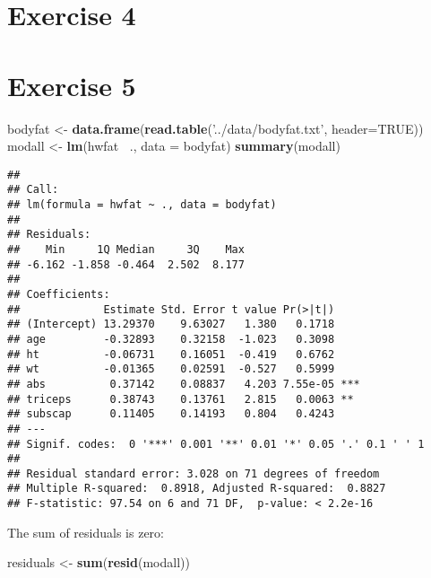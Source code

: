 \documentclass[]{article}
\newenvironment{Shaded}{\begin{snugshade}}{\end{snugshade}}
\newcommand{\DataTypeTok}[1]{\textcolor[rgb]{0.13,0.29,0.53}{#1}}
\newcommand{\KeywordTok}[1]{\textcolor[rgb]{0.13,0.29,0.53}{\textbf{#1}}}
\newcommand{\NormalTok}[1]{#1}
\newcommand{\OperatorTok}[1]{\textcolor[rgb]{0.81,0.36,0.00}{\textbf{#1}}}
\newcommand{\OtherTok}[1]{\textcolor[rgb]{0.56,0.35,0.01}{#1}}
\newcommand{\StringTok}[1]{\textcolor[rgb]{0.31,0.60,0.02}{#1}}
\begin{document}
\hypertarget{exercise-4}{%
\section{Exercise 4}\label{exercise-4}}

\hypertarget{exercise-5}{%
\section{Exercise 5}\label{exercise-5}}

\begin{Shaded}
\begin{Highlighting}[]
\NormalTok{bodyfat <-}\StringTok{ }\KeywordTok{data.frame}\NormalTok{(}\KeywordTok{read.table}\NormalTok{(}\StringTok{'../data/bodyfat.txt'}\NormalTok{, }\DataTypeTok{header=}\OtherTok{TRUE}\NormalTok{))}
\NormalTok{modall <-}\StringTok{ }\KeywordTok{lm}\NormalTok{(hwfat }\OperatorTok{~}\NormalTok{., }\DataTypeTok{data =}\NormalTok{ bodyfat)}
\KeywordTok{summary}\NormalTok{(modall)}
\end{Highlighting}
\end{Shaded}

\begin{verbatim}
## 
## Call:
## lm(formula = hwfat ~ ., data = bodyfat)
## 
## Residuals:
##    Min     1Q Median     3Q    Max 
## -6.162 -1.858 -0.464  2.502  8.177 
## 
## Coefficients:
##             Estimate Std. Error t value Pr(>|t|)    
## (Intercept) 13.29370    9.63027   1.380   0.1718    
## age         -0.32893    0.32158  -1.023   0.3098    
## ht          -0.06731    0.16051  -0.419   0.6762    
## wt          -0.01365    0.02591  -0.527   0.5999    
## abs          0.37142    0.08837   4.203 7.55e-05 ***
## triceps      0.38743    0.13761   2.815   0.0063 ** 
## subscap      0.11405    0.14193   0.804   0.4243    
## ---
## Signif. codes:  0 '***' 0.001 '**' 0.01 '*' 0.05 '.' 0.1 ' ' 1
## 
## Residual standard error: 3.028 on 71 degrees of freedom
## Multiple R-squared:  0.8918, Adjusted R-squared:  0.8827 
## F-statistic: 97.54 on 6 and 71 DF,  p-value: < 2.2e-16
\end{verbatim}

The sum of residuals is zero:

\begin{Shaded}
\begin{Highlighting}[]
\NormalTok{residuals <-}\StringTok{ }\KeywordTok{sum}\NormalTok{(}\KeywordTok{resid}\NormalTok{(modall))}
\end{Highlighting}
\end{Shaded}
\end{document}

